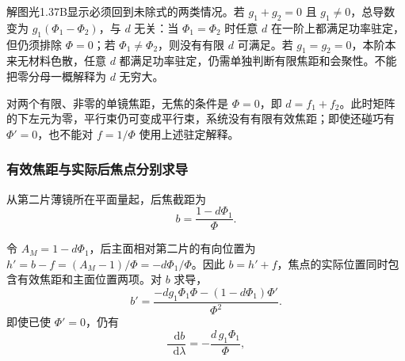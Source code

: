 \documentclass[UTF8,fontset=fandol,a4paper,11pt]{ctexart}
\newcommand{\dd}{\mathop{}\!\mathrm{d}}
\begin{document}
解图光1.37B显示必须回到未除式的两类情况。若 $g_1+g_2=0$ 且 $g_1\ne0$，总导数变为 $g_1(\Phi_1-\Phi_2)$，与 $d$ 无关：当 $\Phi_1=\Phi_2$ 时任意 $d$ 在一阶上都满足功率驻定，但仍须排除 $\Phi=0$；若 $\Phi_1\ne\Phi_2$，则没有有限 $d$ 可满足。若 $g_1=g_2=0$，本阶本来无材料色散，任意 $d$ 都满足功率驻定，仍需单独判断有限焦距和会聚性。不能把零分母一概解释为 $d$ 无穷大。

对两个有限、非零的单镜焦距，无焦的条件是 $\Phi=0$，即 $d=f_1+f_2$。此时矩阵的下左元为零，平行束仍可变成平行束，系统没有有限有效焦距；即使还碰巧有 $\Phi'=0$，也不能对 $f=1/\Phi$ 使用上述驻定解释。

\subsubsection*{有效焦距与实际后焦点分别求导}
从第二片薄镜所在平面量起，后焦截距为
\[
b=\frac{1-d\Phi_1}{\Phi}.
\]

令 $A_M=1-d\Phi_1$，后主面相对第二片的有向位置为 $h'=b-f=(A_M-1)/\Phi=-d\Phi_1/\Phi$。因此 $b=h'+f$，焦点的实际位置同时包含有效焦距和主面位置两项。对 $b$ 求导，
\[
b'=\frac{-d g_1\Phi_1\Phi-(1-d\Phi_1)\Phi'}{\Phi^2}.
\]
即使已使 $\Phi'=0$，仍有
\[
\frac{\dd b}{\dd\lambda}
=-\frac{d\,g_1\Phi_1}{\Phi},
\]
\end{document}
